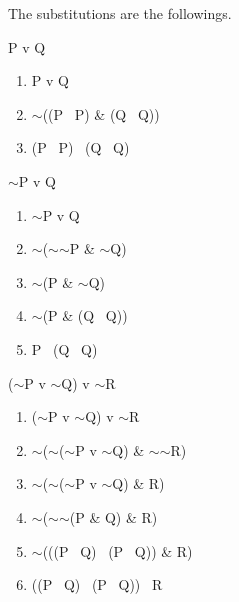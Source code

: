 \documentclass[a4paper,12pt]{article}
\newcommand{\s}{$\sim$}
\newcommand{\tb}{\textbar \ }
\begin{document}
\begin{enumerate}[label=\arabic*,leftmargin=*]
        \item The substitutions are the followings.
            \begin{enumerate}[label=(\roman*)]
                \begin{minipage}{\textwidth}
                \item P v Q
                    \begin{enumerate}[label=\arabic*.]
                        \item P v Q
                        \item \s ((P \tb P) \& (Q \tb Q))
                        \item (P \tb P) \tb (Q \tb Q)
                    \end{enumerate}
                    \vspace{1em}
                \end{minipage}
                \begin{minipage}{\textwidth}
                \item \s P v Q
                    \begin{enumerate}[label=\arabic*.]
                        \item \s P v Q
                        \item \s (\s \s P \& \s Q)
                        \item \s (P \& \s Q)
                        \item \s (P \& (Q \tb Q))
                        \item P \tb (Q \tb Q)
                    \end{enumerate}
                    \vspace{1em}
                \end{minipage}
                \begin{minipage}{\textwidth}
                \item (\s P v \s Q) v \s R
                    \begin{enumerate}[label=\arabic*.]
                        \item (\s P v \s Q) v \s R
                        \item \s (\s (\s P v \s Q) \& \s \s R)
                        \item \s (\s (\s P v \s Q) \& R)
                        \item \s (\s \s (P \& Q) \& R)
                        \item \s (((P \tb Q) \tb (P \tb Q)) \& R)
                        \item ((P \tb Q) \tb (P \tb Q)) \tb R
                    \end{enumerate}
                    \vspace{1em}
                \end{minipage}


\end{enumerate}
\end{enumerate}
\end{document}
